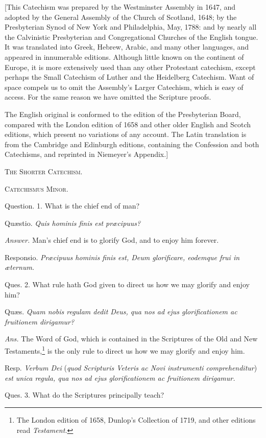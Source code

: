 [This Catechism was prepared by the Westminster Assembly in 1647, and adopted by the General Assembly of the Church of Scotland, 1648; by the Presbyterian Synod of New York and Philadelphia, May, 1788: and by nearly all the Calvinistic Presbyterian and Congregational Churches of the English tongue. It was translated into Greek, Hebrew, Arabic, and many other languages, and appeared in innumerable editions. Although little known on the continent of Europe, it is more extensively used than any other Protestant catechism, except perhaps the Small Catechism of Luther and the Heidelberg Catechism. Want of space compels us to omit the Assembly's Larger Catechism, which is easy of access. For the same reason we have omitted the Scripture proofs.

The English original is conformed to the edition of the Presbyterian Board, compared with the London edition of 1658 and other older English and Scotch editions, which present no variations of any account. The Latin translation is from the Cambridge and Edinburgh editions, containing the Confession and both Catechisms, and reprinted in Niemeyer's Appendix.]

T\textsc{he} S\textsc{horter} C\textsc{atechism.}

C\textsc{atechismus} M\textsc{inor}.

Question. 1. What is the chief end of man?

Quæstio. \emph{Quis hominis finis est præcipuus?}

\emph{Answer.} Man's chief end is to glorify God, and to enjoy him forever.

Responsio. \emph{Præcipuus hominis finis est, Deum glorificare, eodemque frui in æternum.}

Ques. 2. What rule hath God given to direct us how we may glorify and enjoy him?

Quæs. \emph{Quam nobis regulam dedit Deus, qua nos ad ejus glorificationem ac fruitionem dirigamur?}

\emph{Ans.} The Word of God, which is contained in the Scriptures of the Old and New Testaments,\footnote{The London edition of 1658, Dunlop's Collection of 1719, and other editions read \emph{Testament.}} is the only rule to direct us how we may glorify and enjoy him.

Resp. \emph{Verbum Dei }(\emph{quod Scripturis Veteris ac Novi instrumenti comprehenditur}) \emph{est unica regula, qua nos ad ejus glorificationem ac fruitionem dirigamur.}

Ques. 3. What do the Scriptures principally teach?

